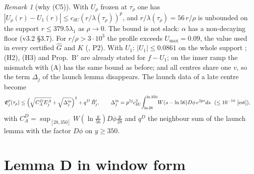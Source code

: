 \documentclass[11pt]{article}
\theoremstyle{definition}\newtheorem{definition}[theorem]{Definition}
\theoremstyle{remark}\newtheorem{remark}[theorem]{Remark}
\newcommand{\fn}[1]{\texttt{\detokenize{#1}}}
\newcommand{\E}{\mathfrak E}\newcommand{\B}{\mathfrak B}\newcommand{\Bh}{\hat B}\newcommand{\Eh}{\hat E^A}
\begin{document}
\begin{remark}[why (C5)]\label{rem:U1}
With $U_\rho$ frozen at $\tau_\rho$ one has $|U_\rho(r)-U_1(r)|\le c_{\delta U}(r/\lambda(\tau_\rho))^p$, and $r/\lambda(\tau_\rho)=56\,r/\rho$ is unbounded on the support $r\le379.5\lambda_1$ as $\rho\to0$. The bound is not slack: $\alpha$ has a non-decaying floor (v3.2 \S3.7). For $r/\rho>3\cdot10^3$ the profile exceeds $U_{\max}=0.09$, the value used in every certified $\hat G$ and $K$ (\fn{ghat_design_arb.py}, P2). With $U_1$: $|U_1|\le0.0861$ on the whole support \tE; (H2), (H3) and Prop.~B$'$ are already stated for $f-U_1$; on the inner ramp the mismatch with (A) has the same bound as before; and all centres share one $v$, so the term $\Delta_j$ of the launch lemma disappears. The launch data of a late centre become
\[
\E^\rho_j(\tau_\rho)\le\Bigl(\sqrt{C_A^DE^A_j}+\sqrt{\Delta^{\rm in}_j}\Bigr)^2+q^D\,\Bh'_j,\qquad\Delta^{\rm in}_j=p^{2j}c_{\delta U}^2\!\int_{\ln28}^{\ln350}\!W(s-\ln56)D\phi\,e^{2ps}ds\ \ (\le10^{-10}\ \tE),
\]
with $C_A^D=\sup_{[28,350]}W(\ln\frac y{56})D\phi\frac y{28}$ and $q^D$ the neighbour sum of the launch lemma with the factor $D\phi$ on $y\ge350$.
\end{remark}

\section{Lemma D in window form}\label{sec:D}
\end{document}
